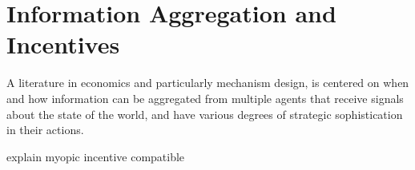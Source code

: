 
\section{Information Aggregation and Incentives}

A literature in economics and particularly mechanism design, is centered on when and how information can be aggregated from multiple agents that receive signals about the state of the world, and have various degrees of strategic sophistication in their actions.

explain myopic incentive compatible




